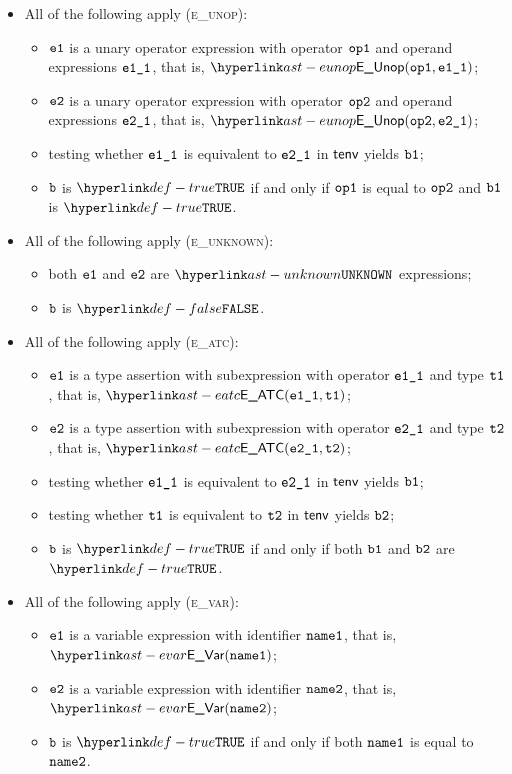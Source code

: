 \begin{itemize}
  \item All of the following apply (\textsc{e\_unop}):
  \begin{itemize}
    \item $\texttt{e1}$ is a unary operator expression with operator $\texttt{op1}$ and operand expressions $\texttt{e1\_1}$,
          that is, $\EUnop(\opone, \veoneone)$;
    \item $\texttt{e2}$ is a unary operator expression with operator $\texttt{op2}$ and operand expressions $\texttt{e2\_1}$,
          that is, $\EUnop(\optwo, \vetwoone)$;
    \item testing whether $\texttt{e1\_1}$ is equivalent to $\texttt{e2\_1}$ in $\textsf{tenv}$ yields $\texttt{b1}$;
    \item $\texttt{b}$ is $\True$ if and only if $\texttt{op1}$ is equal to $\texttt{op2}$ and $\texttt{b1}$ is $\True$.
  \end{itemize}

  \item All of the following apply (\textsc{e\_unknown}):
  \begin{itemize}
    \item both $\texttt{e1}$ and $\texttt{e2}$ are $\UNKNOWN$ expressions;
    \item $\texttt{b}$ is $\False$.
  \end{itemize}

  \item All of the following apply (\textsc{e\_atc}):
  \begin{itemize}
    \item $\texttt{e1}$ is a type assertion with subexpression with operator $\texttt{e1\_1}$ and type $\texttt{t1}$,
          that is, $\EATC(\veoneone, \vtone)$;
    \item $\texttt{e2}$ is a type assertion with subexpression with operator $\texttt{e2\_1}$ and type $\texttt{t2}$,
          that is, $\EATC(\vetwoone, \vttwo)$;
    \item testing whether $\texttt{e1\_1}$ is equivalent to $\texttt{e2\_1}$ in $\textsf{tenv}$ yields $\texttt{b1}$;
    \item testing whether $\texttt{t1}$ is equivalent to $\texttt{t2}$ in $\textsf{tenv}$ yields $\texttt{b2}$;
    \item $\texttt{b}$ is $\True$ if and only if both $\texttt{b1}$ and $\texttt{b2}$ are $\True$.
  \end{itemize}

  \item All of the following apply (\textsc{e\_var}):
  \begin{itemize}
    \item $\texttt{e1}$ is a variable expression with identifier $\texttt{name1}$, that is, $\EVar(\nameone)$;
    \item $\texttt{e2}$ is a variable expression with identifier $\texttt{name2}$, that is, $\EVar(\nametwo)$;
    \item $\texttt{b}$ is $\True$ if and only if both $\texttt{name1}$ is equal to $\texttt{name2}$.
  \end{itemize}
\end{itemize}


